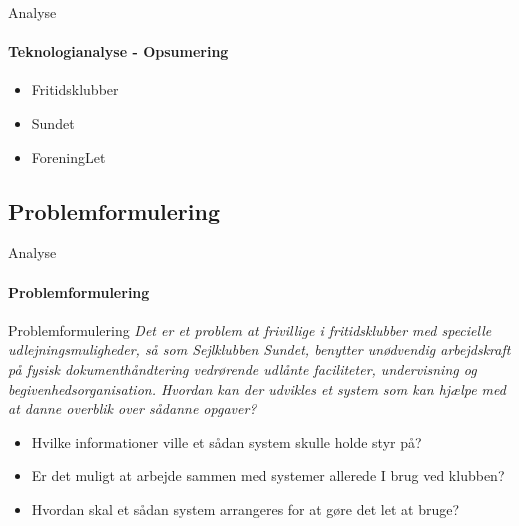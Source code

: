 \begin{frame}{Analyse}
\framesubtitle{Teknologianalyse - Opsumering}
\begin{itemize}
   \item Fritidsklubber
   \item Sundet
   \item ForeningLet
\end{itemize}
\end{frame}

\subsection{Problemformulering}

\begin{frame}{Analyse}
\framesubtitle{Problemformulering}

\begin{beamerboxesrounded}[upper=headerCol,lower=bodyCol,shadow=true]{Problemformulering}
\textit{Det er et problem at frivillige i fritidsklubber med specielle udlejningsmuligheder, så som Sejlklubben Sundet, benytter unødvendig arbejdskraft på fysisk dokumenthåndtering vedrørende udlånte faciliteter, undervisning og begivenhedsorganisation. Hvordan kan der udvikles et system som kan hjælpe med at danne overblik over sådanne opgaver?}
\end{beamerboxesrounded}

  \begin{itemize}
  
    
    \item Hvilke informationer ville et sådan system skulle holde styr på?
    \item Er det muligt at arbejde sammen med systemer allerede I brug ved klubben?
    \item Hvordan skal et sådan system arrangeres for at gøre det let at bruge?
  \end{itemize}
\end{frame}
